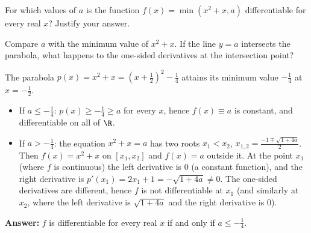 
\begin{question}
For which values of $a$ is the function $f(x)=\min\left(x^2+x,a\right)$ differentiable for every real $x$? Justify your answer.
\end{question}

\begin{hint}
Compare $a$ with the minimum value of $x^2+x$. If the line $y=a$ intersects the parabola, what happens to the one-sided derivatives at the intersection point?
\end{hint}

\begin{solution}
The parabola $p(x)=x^2+x=\left(x+\frac12\right)^2-\frac14$ attains its minimum value $-\frac14$ at $x=-\frac12$.
\begin{itemize}
  \item If $a\le-\frac14$: $p(x)\ge-\frac14\ge a$ for every $x$, hence $f(x)\equiv a$ is constant, and differentiable on all of $\R$.
  \item If $a>-\frac14$: the equation $x^2+x=a$ has two roots $x_1<x_2$, $x_{1,2}=\frac{-1\mp\sqrt{1+4a}}{2}$. Then $f(x)=x^2+x$ on $[x_1,x_2]$ and $f(x)=a$ outside it. At the point $x_1$ (where $f$ is continuous) the left derivative is $0$ (a constant function), and the right derivative is $p'(x_1)=2x_1+1=-\sqrt{1+4a}\neq0$. The one-sided derivatives are different, hence $f$ is not differentiable at $x_1$ (and similarly at $x_2$, where the left derivative is $\sqrt{1+4a}$ and the right derivative is $0$).
\end{itemize}
\textbf{Answer:} $f$ is differentiable for every real $x$ if and only if $\boxed{a\le-\frac14}$.
\end{solution}
